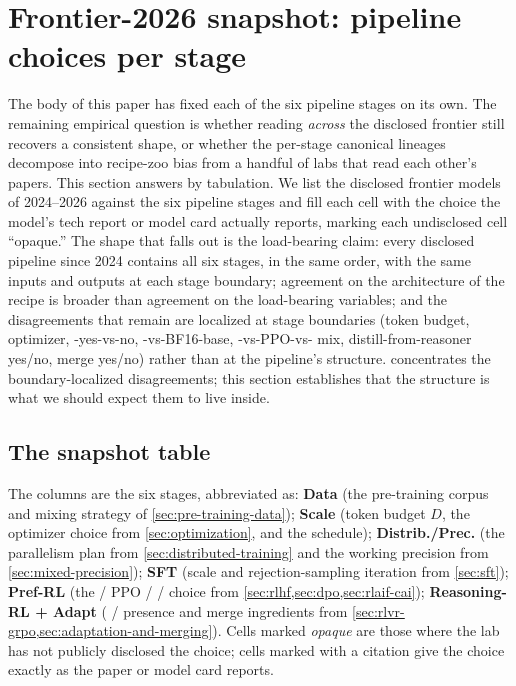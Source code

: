 
\section{Frontier-2026 snapshot: pipeline choices per stage}
\label{sec:frontier-snapshot}

The body of this paper has fixed each of the six pipeline stages on
its own. The remaining empirical question is whether reading
\emph{across} the disclosed frontier still recovers a consistent
shape, or whether the per-stage canonical lineages decompose into
recipe-zoo bias from a handful of labs that read each other's papers.
This section answers by tabulation. We list the disclosed frontier
models of 2024--2026 against the six pipeline stages and fill each
cell with the choice the model's tech report or model card actually
reports, marking each undisclosed cell ``opaque.'' The shape that
falls out is the load-bearing claim: every disclosed pipeline since
2024 contains all six stages, in the same order, with the same
inputs and outputs at each stage boundary; agreement on the
architecture of the recipe is broader than agreement on the
load-bearing variables; and the disagreements that remain are
localized at stage boundaries (token budget, optimizer, -yes-vs-no,
-vs-BF16-base, -vs-PPO-vs- mix, distill-from-reasoner
yes/no, merge yes/no) rather than at the
pipeline's structure.  concentrates the
boundary-localized disagreements; this section establishes that the
structure is what we should expect them to live inside.

\subsection{The snapshot table}
\label{sec:snap-table}

The columns are the six stages, abbreviated as: \textbf{Data} (the
pre-training corpus and mixing strategy of \cref{sec:pre-training-data});
\textbf{Scale} (token budget $D$, the optimizer choice from
\cref{sec:optimization}, and the schedule); \textbf{Distrib./Prec.}
(the parallelism plan from \cref{sec:distributed-training} and the
working precision from \cref{sec:mixed-precision}); \textbf{SFT}
(scale and rejection-sampling iteration from \cref{sec:sft});
\textbf{Pref-RL} (the  / PPO /  /  choice from
\cref{sec:rlhf,sec:dpo,sec:rlaif-cai}); \textbf{Reasoning-RL +
Adapt} ( /  presence and merge ingredients from
\cref{sec:rlvr-grpo,sec:adaptation-and-merging}). Cells marked
\emph{opaque} are those where the lab has not publicly disclosed the
choice; cells marked with a citation give the choice exactly as the
paper or model card reports.


